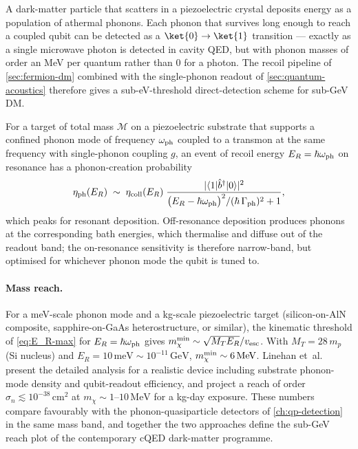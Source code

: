 \begin{phenomenon}
A dark-matter particle that scatters in a piezoelectric crystal
deposits energy as a population of athermal phonons. Each phonon
that survives long enough to reach a coupled qubit can be detected
as a $\ket{0}\to\ket{1}$ transition --- exactly as a single
microwave photon is detected in cavity QED, but with phonon
masses of order an MeV per quantum rather than 0 for a photon. The
recoil pipeline of \cref{sec:fermion-dm} combined with the
single-phonon readout of \cref{sec:quantum-acoustics} therefore
gives a sub-eV-threshold direct-detection scheme for sub-GeV DM.
\end{phenomenon}

\begin{statement}
\label{stmt:phonon-dm}
For a target of total mass $\mathcal M$ on a piezoelectric
substrate that supports a confined phonon mode of frequency
$\omega_{\rm ph}$ coupled to a transmon at the same frequency
with single-phonon coupling $g$, an event of recoil energy
$E_R=\hbar\omega_{\rm ph}$ on resonance has a phonon-creation
probability
\begin{equation}
\label{eq:phonon-eta}
\eta_{\rm ph}(E_R) \;\sim\; \eta_{\rm coll}(E_R)\;\frac{|\langle 1|\hat b^\dagger|0\rangle|^2}{\bigl(E_R-\hbar\omega_{\rm ph}\bigr)^2/(\hbar\,\Gamma_{\rm ph})^2 + 1},
\end{equation}
which peaks for resonant deposition. Off-resonance deposition
produces phonons at the corresponding bath energies, which
thermalise and diffuse out of the readout band; the on-resonance
sensitivity is therefore narrow-band, but optimised for whichever
phonon mode the qubit is tuned to.
\end{statement}

\paragraph{Mass reach.}
For a meV-scale phonon mode and a kg-scale piezoelectric target
(silicon-on-AlN composite, sapphire-on-GaAs heterostructure, or
similar), the kinematic threshold of \cref{eq:E_R-max} for
$E_R=\hbar\omega_{\rm ph}$ gives
$m_\chi^{\rm min}\sim\sqrt{M_T E_R}/v_{\rm esc}$. With
$M_T = 28\,m_p$ (Si nucleus) and
$E_R=10\,\text{meV}\sim 10^{-11}\,\text{GeV}$,
$m_\chi^{\rm min}\sim 6\,\text{MeV}$. Linehan
et~al.~\cite{linehan2024} present the detailed analysis for a
realistic device including substrate phonon-mode density and
qubit-readout efficiency, and project a reach of order
$\sigma_n\lesssim 10^{-38}\,\text{cm}^2$ at
$m_\chi\sim 1$--$10\,\text{MeV}$ for a kg-day exposure. These
numbers compare favourably with the phonon-quasiparticle
detectors of \cref{ch:qp-detection} in the same mass band, and
together the two approaches define the sub-GeV reach plot of the
contemporary cQED dark-matter programme.

